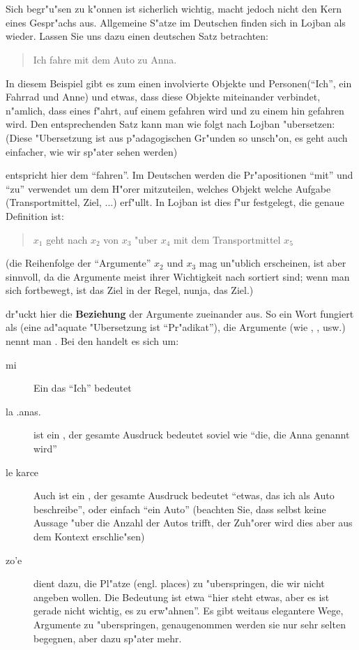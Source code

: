 \chapter{}
Sich begr"u"sen zu k"onnen ist sicherlich wichtig, macht jedoch nicht den Kern eines Gespr"achs aus. Allgemeine S"atze im Deutschen finden sich in Lojban als  wieder.
Lassen Sie uns dazu einen deutschen Satz betrachten:
\begin{quote}
Ich fahre mit dem Auto zu Anna.
\end{quote}
In diesem Beispiel gibt es zum einen involvierte Objekte und Personen(``Ich'', ein Fahrrad und Anne) und etwas, dass diese Objekte miteinander verbindet, n"amlich, dass
eines f"ahrt, auf einem gefahren wird und zu einem hin gefahren wird.
Den entsprechenden Satz kann man wie folgt nach Lojban "ubersetzen: (Diese "Ubersetzung ist aus p"adagogischen Gr"unden so unsch"on, es geht auch einfacher, wie wir sp"ater sehen werden)
\begin{quote}
\end{quote}
 entspricht hier dem ``fahren''. Im Deutschen werden die Pr"apositionen ``mit'' und ``zu'' verwendet um dem H"orer mitzuteilen, welches Objekt welche Aufgabe (Transportmittel, Ziel, ...) erf"ullt.
In Lojban ist dies f"ur  festgelegt, die genaue Definition ist:
\begin{quote}
$x_1$ geht nach $x_2$ von $x_3$ "uber $x_4$ mit dem Transportmittel $x_5$
\end{quote}
(die Reihenfolge der ``Argumente'' $x_2$ und $x_3$ mag un"ublich erscheinen, ist aber sinnvoll, da die Argumente meist ihrer Wichtigkeit nach sortiert sind; wenn man 
sich fortbewegt, ist das Ziel in der Regel, nunja, das Ziel.)

 dr"uckt hier die \textbf{Beziehung} der Argumente zueinander aus. So ein Wort fungiert als  (eine ad"aquate "Ubersetzung ist ``Pr"adikat''), die Argumente
(wie , , usw.) nennt man .
Bei den  handelt es sich um:
\begin{description}
\item[mi] Ein  das ``Ich'' bedeutet
\item[la .anas.]  ist ein , der gesamte Ausdruck bedeutet soviel wie ``die, die Anna genannt wird''
\item[le karce] Auch  ist ein , der gesamte Ausdruck bedeutet ``etwas, das ich als Auto beschreibe'', oder einfach ``ein Auto''
(beachten Sie, dass  selbst keine Aussage "uber die Anzahl der Autos trifft, der Zuh"orer wird dies aber aus dem Kontext erschlie"sen)
\item[zo'e]  dient dazu, die Pl"atze (engl. places) zu "uberspringen, die wir nicht angeben wollen. Die Bedeutung ist etwa ``hier steht etwas, aber es ist
gerade nicht wichtig, es zu erw"ahnen''. Es gibt weitaus elegantere Wege, Argumente zu "uberspringen, genaugenommen werden sie  nur sehr selten begegnen, aber dazu
sp"ater mehr.
\end{description}

